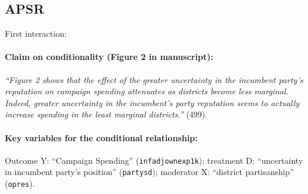 \documentclass[12pt]{article}
\begin{document}
\subsection{\citet{Kim2013} APSR} \label{kim}

\noindent First interaction:

\paragraph{Claim on conditionality (Figure 2 in manuscript):} \emph{``Figure 2 shows that the effect of the greater uncertainty in the incumbent party's reputation on campaign spending attenuates as districts become less marginal. Indeed, greater uncertainty in the incumbent's party reputation seems to actually increase spending in the least marginal districts.''} (499). 

\paragraph{Key variables for the conditional relationship:} Outcome Y:
``Campaign Spending'' (\texttt{infadjownexp1k}); treatment D: ``uncertainty in incumbent party's position'' (\texttt{partysd}); moderator X: ``district partisanship''
(\texttt{opres}).

\newpage
\end{document}
